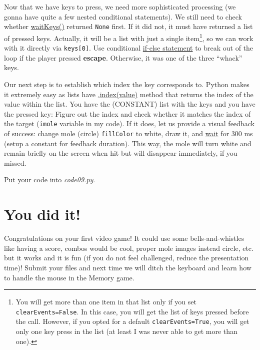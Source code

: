 \documentclass[
]{book}
\begin{document}
Now that we have keys to press, we need more sophisticated processing (we gonna have quite a few nested conditional statements). We still need to check whether \href{https://psychopy.org/api/event.html\#psychopy.event.waitKeys}{waitKeys()} returned \texttt{None} first. If it did not, it must have returned a list of pressed keys. Actually, it will be a list with just a single item\footnote{You will get more than one item in that list only if you set \texttt{clearEvents=False}. In this case, you will get the list of keys pressed before the call. However, if you opted for a default \texttt{clearEvents=True}, you will get only one key press in the list (at least I was never able to get more than one).}, so we can work with it directly via \texttt{keys{[}0{]}}. Use conditional \protect\hyperlink{if-statement}{if-else statement} to break out of the loop if the player pressed \textbf{escape}. Otherwise, it was one of the three ``whack'' keys.

Our next step is to establish which index the key corresponds to. Python makes it extremely easy as lists have \href{https://docs.python.org/3/tutorial/datastructures.html\#more-on-lists}{.index(value)} method that returns the index of the value within the list. You have the (CONSTANT) list with the keys and you have the pressed key: Figure out the index and check whether it matches the index of the target (\texttt{imole} variable in my code). If it does, let us provide a visual feedback of success: change mole (circle) \texttt{fillColor} to white, draw it, and \href{https://psychopy.org/api/clock.html\#psychopy.clock.wait}{wait} for 300 ms (setup a constant for feedback duration). This way, the mole will turn white and remain briefly on the screen when hit but will disappear immediately, if you missed.

Put your code into \emph{code09.py}.

\hypertarget{you-did-it}{%
\section{You did it!}\label{you-did-it}}

Congratulations on your first video game! It could use some bells-and-whistles like having a score, combos would be cool, proper mole images instead circle, etc. but it works and it is fun (if you do not feel challenged, reduce the presentation time)! Submit your files and next time we will ditch the keyboard and learn how to handle the mouse in the Memory game.
\end{document}
